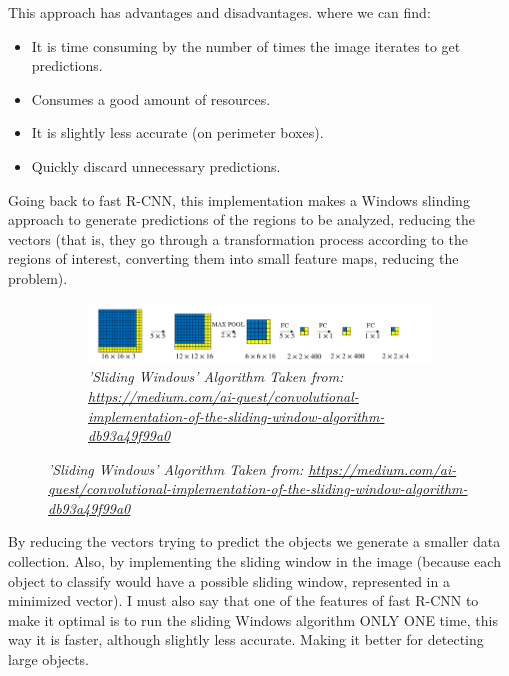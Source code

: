 This approach has advantages and disadvantages. where we can find:
\begin{itemize}
    \item It is time consuming by the number of times the image iterates to get
          predictions.
    \item Consumes a good amount of resources.
    \item It is slightly less accurate (on perimeter boxes).
    \item Quickly discard unnecessary predictions.
\end{itemize}

Going back to fast R-CNN, this implementation makes a Windows slinding approach
to generate predictions of the regions to be analyzed, reducing the vectors
(that is, they go through a transformation process according to the regions of
interest, converting them into small feature maps, reducing the problem). \cite{rcnn_2}

\begin{figure}[H]
    \centering
    \begin{subfigure}[b]{0.8\textwidth}
        \centering
        \includegraphics[width=\textwidth]{Figures/2. Related Work/rcnn_4.png}
        \caption{\textit{'Sliding Windows' Algorithm Taken from:
                \url{https://medium.com/ai-quest/convolutional-implementation-of-the-sliding-window-algorithm-db93a49f99a0}
            }}
    \end{subfigure}
\end{figure}

By reducing the vectors trying to predict the objects we generate a smaller
data collection. Also, by implementing the sliding window in the image (because
each object to classify would have a possible sliding window, represented in a
minimized vector). I must also say that one of the features of fast R-CNN to
make it optimal is to run the sliding Windows algorithm ONLY ONE time, this way
it is faster, although slightly less accurate. Making it better for detecting
large objects.